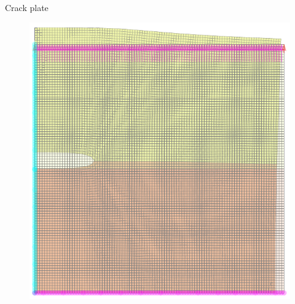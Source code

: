 \documentclass[aspectratio=169,xcolor=dvipsnames]{beamer}
\begin{document}
\begin{frame}{Crack plate}
\begin{figure}
\begin{minipage}{\linewidth}
\begin{minipage}{0.65\linewidth}
\begin{minipage}[b]{0.3\linewidth}
						\centering
					 \fontsize{3pt}{4pt}
	\end{minipage}\hfill
			\begin{minipage}[b]{0.3\linewidth}
				\centering
					\includegraphics[width=\linewidth]{plate_250_1509.pdf}
								 \fontsize{3pt}{4pt}
			\end{minipage}\hfill
			\begin{minipage}[b]{0.3\linewidth}
								\centering

\end{minipage}
\end{minipage}
\end{minipage}
\end{figure}
\end{frame}
\end{document}
